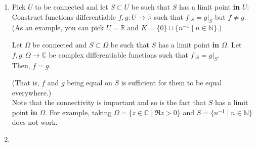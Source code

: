 \documentclass[12pt]{article}
\theoremstyle{definition}
\numberwithin{thm}{section}
\newenvironment{blockquote}
{\begin{mdframed}[skipabove=0pt, skipbelow=0pt, innertopmargin=4pt, innerbottommargin=4pt, bottomline=false,topline=false,rightline=false, linewidth=2pt]}
{\end{mdframed}}
\begin{document}
\begin{enumerate}
	\item Pick $U$ to be connected and let $S \subset U$ be such that $S$ has a limit point \textbf{in} $U$: Construct functions differentiable $f, g:U \to \mathbb{R}$ such that $f|_S = g|_S$ but $f \neq g.$\\
	(As an example, you can pick $U = \mathbb{R}$ and $K = \{0\} \cup \{n^{-1} \mid n \in \mathbb{N}\}.$)\\
	\begin{blockquote}
		Let $\Omega$ be connected and $S \subset \Omega$ be such that $S$ has a limit point \textbf{in} $\Omega.$ Let $f, g:\Omega \to \mathbb{C}$ be complex differentiable functions such that $f|_S = g|_S.$\\
		Then, $f = g.$
	\end{blockquote}
	(That is, $f$ and $g$ being equal on $S$ is sufficient for them to be equal everywhere.)\\
	Note that the connectivity is important and so is the fact that $S$ has a limit point \textbf{in} $\Omega.$ For example, taking $\Omega = \{z \in \mathbb{C} \mid \Re z > 0\}$ and $S = \{n^{-1} \mid n \in \mathbb{N}\}$ does not work.
	\item 


\end{enumerate}
\end{document}
